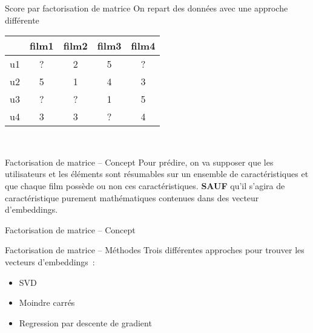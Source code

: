 \begin{frame}{Score par factorisation de matrice}
  On repart des données avec une approche différente
  \begin{center}
    \begin{tabular}{|l|c|c|c|c|}
      \hline
      & film1 & film2 & film3 & film4 \\
      \hline
      u1 & ? & 2 & 5 & ? \\
      \hline
      u2 & 5 & 1 & 4 & 3 \\
    \hline
    u3 & ? & ? & 1 & 5 \\
    \hline
    u4 & 3 & 3 & ? & 4 \\
    \hline
    \end{tabular}\\
    \end{center}
\end{frame}

\begin{frame}{Factorisation de matrice -- Concept}
  Pour prédire, on va supposer que les utilisateurs et les éléments sont résumables sur un \alert{ensemble de caractéristiques} et que chaque film possède ou non ces caractéristiques.
  \vfill
  \textbf{SAUF} qu'il s'agira de caractéristique purement mathématiques contenues dans des \alert{vecteur d'embeddings}.
\end{frame}

\begin{frame}{Factorisation de matrice -- Concept}
\end{frame}

\begin{frame}{Factorisation de matrice -- Méthodes}
  Trois différentes approches pour trouver les vecteurs d'embeddings~:
  \begin{itemize}
    \item SVD 
    \item Moindre carrés
    \item Regression par descente de gradient
  \end{itemize}
\end{frame}

